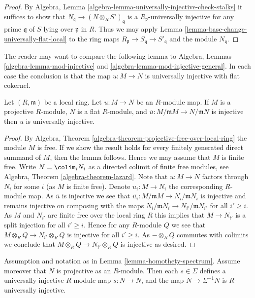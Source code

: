 \begin{proof}
By
Algebra, Lemma \ref{algebra-lemma-universally-injective-check-stalks}
it suffices to show that $N_{\mathfrak q} \to (N \otimes_R S')_{\mathfrak q}$
is a $R_{\mathfrak p}$-universally injective for any prime $\mathfrak q$
of $S$ lying over $\mathfrak p$ in $R$. Thus we may apply
Lemma \ref{lemma-base-change-universally-flat-local}
to the ring maps
$R_{\mathfrak p} \to S_{\mathfrak q} \to S'_{\mathfrak q}$
and the module $N_{\mathfrak q}$.
\end{proof}

\noindent
The reader may want to compare the following lemma to
Algebra, Lemmas \ref{algebra-lemma-mod-injective} and
\ref{algebra-lemma-mod-injective-general}.
In each case the conclusion is that the map $u : M \to N$ is
universally injective with flat cokernel.

\begin{lemma}
\label{lemma-universally-injective-local}
Let $(R, \mathfrak m)$ be a local ring. Let $u : M \to N$ be an $R$-module map.
If $M$ is a projective $R$-module, $N$ is a flat $R$-module, and
$\overline{u} : M/\mathfrak mM \to N/\mathfrak mN$ is injective
then $u$ is universally injective.
\end{lemma}

\begin{proof}
By
Algebra, Theorem \ref{algebra-theorem-projective-free-over-local-ring}
the module $M$ is free. If we show the result holds for every finitely
generated direct summand of $M$, then the lemma follows. Hence we may
assume that $M$ is finite free. Write $N = \colim_i N_i$ as
a directed colimit of finite free modules, see
Algebra, Theorem \ref{algebra-theorem-lazard}.
Note that $u : M \to N$ factors through $N_i$ for some $i$ (as $M$ is finite
free). Denote $u_i : M \to N_i$ the corresponding $R$-module map.
As $\overline{u}$ is injective we see that
$\overline{u_i} : M/\mathfrak mM \to N_i/\mathfrak mN_i$ is
injective and remains injective on composing with the maps
$N_i/\mathfrak mN_i \to N_{i'}/\mathfrak mN_{i'}$ for all $i' \geq i$.
As $M$ and $N_{i'}$ are finite free over the local ring $R$ this implies
that $M \to N_{i'}$ is a split injection for all $i' \geq i$. Hence
for any $R$-module $Q$ we see that $M \otimes_R Q \to N_{i'} \otimes_R Q$
is injective for all $i' \geq i$. As $- \otimes_R Q$ commutes with
colimits we conclude that $M \otimes_R Q \to N_{i'} \otimes_R Q$
is injective as desired.
\end{proof}

\begin{lemma}
\label{lemma-invert-universally-injective}
Assumption and notation as in
Lemma \ref{lemma-homothety-spectrum}.
Assume moreover that $N$ is projective as an $R$-module.
Then each $s \in \Sigma$ defines a
universally injective $R$-module map $s : N \to N$, and the
map $N \to \Sigma^{-1}N$ is $R$-universally injective.
\end{lemma}

